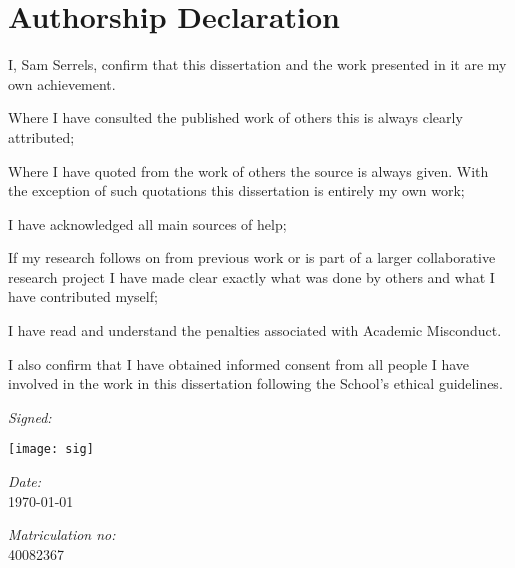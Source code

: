 
\section*{Authorship Declaration}
\vspace{0.5cm}
\begin{flushleft}
I, Sam Serrels, confirm that this dissertation and the work presented in it are my own achievement.\newline

Where I have consulted the published work of others this is always clearly attributed;\newline

Where I have quoted from the work of others the source is always given. With the exception of such quotations this dissertation is entirely my own work;\newline

I have acknowledged all main sources of help; \newline

If my research follows on from previous work or is part of a larger collaborative research project I have made clear exactly what was done by others and what I have contributed myself;\newline

I have read and understand the penalties associated with Academic Misconduct.\newline

I also confirm that I have obtained informed consent from all people I have involved in the work in this dissertation following the School's ethical guidelines.\newline
\end{flushleft}

\begin{flushleft} \large
\emph{Signed:} \\
\end{flushleft}
\texttt{[image: sig]}
\vspace{.5cm}

\begin{flushleft} \large
\emph{Date:} \\
\today
\end{flushleft}

\vspace{.5cm}

\begin{flushleft} \large
\emph{Matriculation no: } \\
40082367
\end{flushleft}
